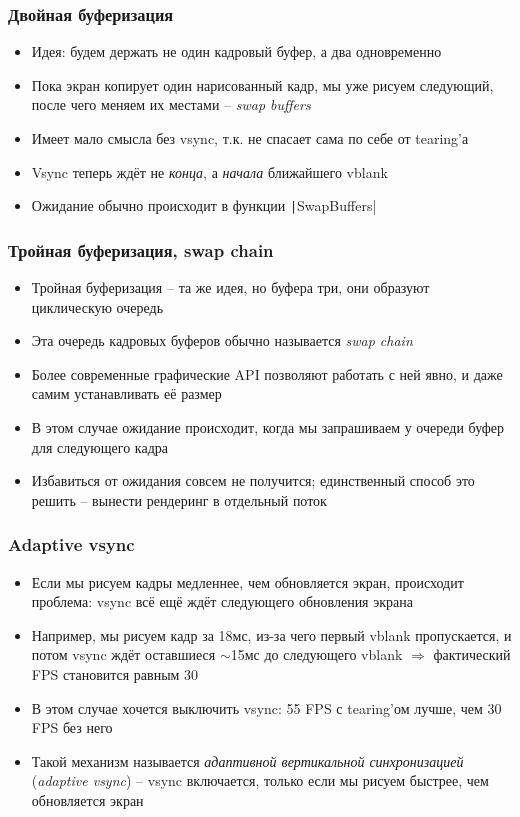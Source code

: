 \documentclass{beamer}
\begin{document}
\begin{frame}[fragile]
\frametitle{Двойная буферизация}
\begin{itemize}
\item Идея: будем держать не один кадровый буфер, а два одновременно
\pause
\item Пока экран копирует один нарисованный кадр, мы уже рисуем следующий, после чего меняем их местами -- \textit{swap buffers}
\pause
\item Имеет мало смысла без vsync, т.к. не спасает сама по себе от tearing'а
\pause
\item Vsync теперь ждёт не \textit{конца}, а \textit{начала} ближайшего vblank
\pause
\item Ожидание обычно происходит в функции \texttt|SwapBuffers|
\end{itemize}
\end{frame}

\begin{frame}[fragile]
\frametitle{Тройная буферизация, swap chain}
\begin{itemize}
\item Тройная буферизация -- та же идея, но буфера три, они образуют циклическую очередь
\pause
\item Эта очередь кадровых буферов обычно называется \textit{swap chain}
\pause
\item Более современные графические API позволяют работать с ней явно, и даже самим устанавливать её размер
\pause
\item В этом случае ожидание происходит, когда мы запрашиваем у очереди буфер для следующего кадра
\pause
\item Избавиться от ожидания совсем не получится; единственный способ это решить -- вынести рендеринг в отдельный поток
\end{itemize}
\end{frame}

\begin{frame}[fragile]
\frametitle{Adaptive vsync}
\begin{itemize}
\item Если мы рисуем кадры медленнее, чем обновляется экран, происходит проблема: vsync всё ещё ждёт следующего обновления экрана
\pause
\item Например, мы рисуем кадр за 18мс, из-за чего первый vblank пропускается, и потом vsync ждёт оставшиеся $\sim$15мс до следующего vblank $\Longrightarrow$ фактический FPS становится равным 30
\pause
\item В этом случае хочется выключить vsync: 55 FPS с tearing'ом лучше, чем 30 FPS без него
\pause
\item Такой механизм называется \textit{адаптивной вертикальной синхронизацией} (\textit{adaptive vsync}) -- vsync включается, только если мы рисуем быстрее, чем обновляется экран
\end{itemize}
\end{frame}
\end{document}
